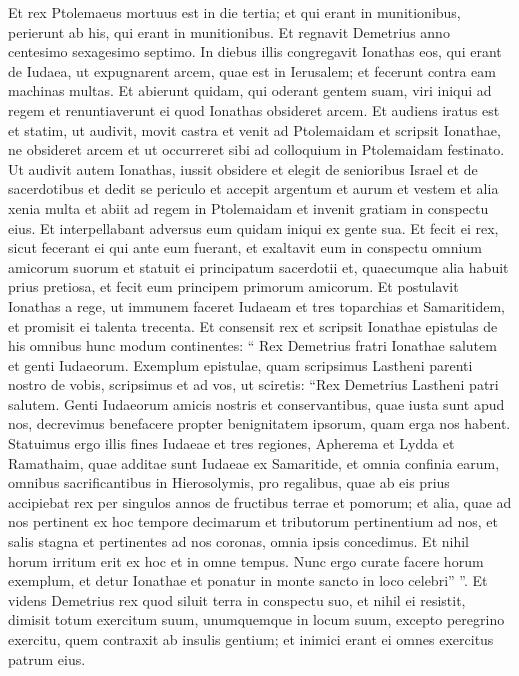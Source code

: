\begin{biblechapter}
\begin{biblechapter}
\begin{biblechapter}
\begin{biblechapter}
\begin{biblechapter}
\begin{biblechapter}
\begin{biblechapter}
\begin{biblechapter}
\begin{biblechapter}
\begin{biblechapter}
\begin{biblechapter}
\verse Et rex Ptolemaeus mortuus est in die tertia; et qui erant in munitionibus, perierunt ab his, qui erant in munitionibus. 
\verse Et regnavit Demetrius anno centesimo sexagesimo septimo.
 \verse In diebus illis congregavit Ionathas eos, qui erant de Iudaea, ut expugnarent arcem, quae est in Ierusalem; et fecerunt contra eam machinas multas. 
\verse Et abierunt quidam, qui oderant gentem suam, viri iniqui ad regem et renuntiaverunt ei quod Ionathas obsideret arcem. 
\verse Et audiens iratus est et statim, ut audivit, movit castra et venit ad Ptolemaidam et scripsit Ionathae, ne obsideret arcem et ut occurreret sibi ad colloquium in Ptolemaidam festinato. 
\verse Ut audivit autem Ionathas, iussit obsidere et elegit de senioribus Israel et de sacerdotibus et dedit se periculo 
\verse et accepit argentum et aurum et vestem et alia xenia multa et abiit ad regem in Ptolemaidam et invenit gratiam in conspectu eius. 
\verse Et interpellabant adversus eum quidam iniqui ex gente sua. 
\verse Et fecit ei rex, sicut fecerant ei qui ante eum fuerant, et exaltavit eum in conspectu omnium amicorum suorum 
\verse et statuit ei principatum sacerdotii et, quaecumque alia habuit prius pretiosa, et fecit eum principem primorum amicorum.
 \verse Et postulavit Ionathas a rege, ut immunem faceret Iudaeam et tres toparchias et Samaritidem, et promisit ei talenta trecenta. 
\verse Et consensit rex et scripsit Ionathae epistulas de his omnibus hunc modum continentes: 
\verse “ Rex Demetrius fratri Ionathae salutem et genti Iudaeorum. 
\verse Exemplum epistulae, quam scripsimus Lastheni parenti nostro de vobis, scripsimus et ad vos, ut sciretis:
 \verse “Rex Demetrius Lastheni patri salutem. 
\verse Genti Iudaeorum amicis nostris et conservantibus, quae iusta sunt apud nos, decrevimus benefacere propter benignitatem ipsorum, quam erga nos habent. 
\verse Statuimus ergo illis fines Iudaeae et tres regiones, Apherema et Lydda et Ramathaim, quae additae sunt Iudaeae ex Samaritide, et omnia confinia earum, omnibus sacrificantibus in Hierosolymis, pro regalibus, quae ab eis prius accipiebat rex per singulos annos de fructibus terrae et pomorum; 
\verse et alia, quae ad nos pertinent ex hoc tempore decimarum et tributorum pertinentium ad nos, et salis stagna et pertinentes ad nos coronas, omnia ipsis concedimus. 
\verse Et nihil horum irritum erit ex hoc et in omne tempus. 
\verse Nunc ergo curate facere horum exemplum, et detur Ionathae et ponatur in monte sancto in loco celebri” ”.
 \verse Et videns Demetrius rex quod siluit terra in conspectu suo, et nihil ei resistit, dimisit totum exercitum suum, unumquemque in locum suum, excepto peregrino exercitu, quem contraxit ab insulis gentium; et inimici erant ei omnes exercitus patrum eius. 

\end{biblechapter}
\end{biblechapter}
\end{biblechapter}
\end{biblechapter}
\end{biblechapter}
\end{biblechapter}
\end{biblechapter}
\end{biblechapter}
\end{biblechapter}
\end{biblechapter}
\end{biblechapter}
